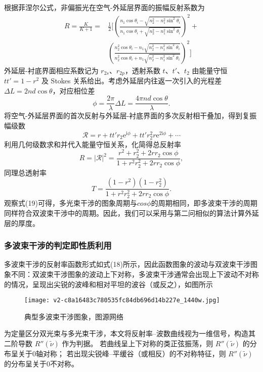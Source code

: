\documentclass[withoutpreface,bwprint]{cumcmthesis}
\begin{document}
根据菲涅尔公式，非偏振光在空气-外延层界面的振幅反射系数为
\begin{equation}
	\begin{split}
	R = \frac{K}{K + 1} = &\frac{1}{2}\bigg[ \left( \frac{n_1 \cos\theta_i - \sqrt{n_2^2 - n_1^2 \sin^2\theta_i}}{n_1 \cos\theta_i + \sqrt{n_2^2 - n_1^2 \sin^2\theta_i}} \right)^2 + \\
	&\left( \frac{n_2^2 \cos\theta_i - n_1 \sqrt{n_2^2 - n_1^2 \sin^2\theta_i}}{n_2^2 \cos\theta_i + n_1 \sqrt{n_2^2 - n_1^2 \sin^2\theta_i}} \right)^2 \bigg]
	\end{split}\tag{14}
	\end{equation}
外延层-衬底界面相应系数记为 \(r_{2s}\)、\(r_{2p}\)，透射系数 \(t\)、\(t'\)、\(t_2\) 由能量守恒 \(t t'=1-r^2\) 及 Stokes 关系给出。考虑外延层内往返一次引入的光程差 \(\Delta L=2 n d \cos\theta\)，对应相位差
\begin{equation}
\phi=\frac{2\pi}{\lambda}\Delta L=\frac{4\pi n d \cos\theta}{\lambda}.
\end{equation}
将空气-外延层界面的首次反射与外延层-衬底界面的多次反射相干叠加，得到复振幅级数
\begin{equation}
\mathcal{R}=r + t t' r_2 \mathrm{e}^{\mathrm{i}\phi} + t t' r_2^2 r \mathrm{e}^{2\mathrm{i}\phi} +\dotsb
\end{equation}
利用几何级数求和并代入能量守恒关系，化简得总反射率
\begin{equation}
R=|\mathcal{R}|^2=\frac{r^2+r_2^2+2 r r_2\cos\phi}{1+r^2 r_2^2+2 r r_2\cos\phi},
\end{equation}
同理总透射率
\begin{equation}
T=\frac{(1-r^2)(1-r_2^2)}{1+r^2 r_2^2+2 r r_2\cos\phi}.
\end{equation}
观察式(19)可得，多光束干涉的图象周期与$cos\phi$的周期相同，即多波束干涉的周期同样符合双波束干涉中的周期。因此，我们可以采用与第二问相似的算法计算外延层的厚度。
\subsubsection{多波束干涉的判定即性质利用}
多波束干涉的反射率函数形式如式(18)所示，因此函数图象的波动与双波束干涉图象不同：双波束干涉图象的波动上下对称，多波束干涉通常会出现上下波动不对称的情况，呈现出尖锐的波峰和相对平坦的波谷（或反之），如图所示
\begin{figure}[H]
		\centering
		\texttt{[image: v2-c8a16483c780535fc84db696d14b227e\_1440w.jpg]}
		\caption{典型多波束干涉图象，图源网络}

	\end{figure}
为定量区分双光束与多光束干涉，本文将反射率–波数曲线视为一维信号，构造其
二阶导数 $R''(\tilde{\nu})$ 作为判据。
若曲线呈上下对称的类正弦振荡，则 $R''(\tilde{\nu})$ 的分布呈关于$0$轴对称；
若出现尖锐峰–平缓谷（或相反）的不对称特征，则 $R''(\tilde{\nu})$ 的分布呈关于$0$不对称。
\end{document}
